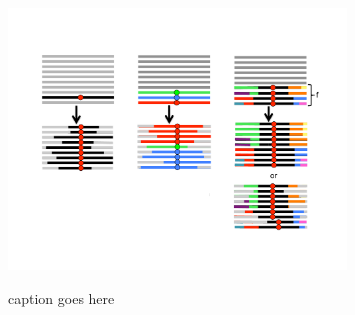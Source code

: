 \documentclass[a4paper,10pt]{article}
\newcommand{\jb}[1]{{\it\color{blue} (#1)} }
\begin{document}




\begin{figure}
	\includegraphics[width = 0.8\textwidth]{../Paper_Figures/three_kinds_of_sweep.pdf} \label{cartoon_3_kinds}
	\caption{caption goes here}
\end{figure}
\end{document}
